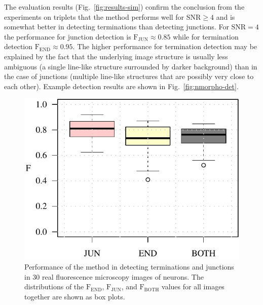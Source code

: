 The evaluation results (Fig.~\ref{fig:results-sim}) confirm the conclusion from the experiments on triplets that the method performs well for $\textrm{SNR} \geq 4$ and is somewhat better in detecting terminations than detecting junctions. For $\textrm{SNR} = 4$ the performance for junction detection is $\textrm{F}_{\textrm{JUN}} \approx 0.85$ while for termination detection $\textrm{F}_{\textrm{END}} \approx 0.95$. The higher performance for termination detection may be explained by the fact that the underlying image structure is usually less ambiguous (a single line-like structure surrounded by darker background) than in the case of junctions (multiple line-like structures that are possibly very close to each other). Example detection results are shown in Fig.~\ref{fig:nmorpho-det}.
\begin{figure}[!h]
	\centering
	\includegraphics[width=0.5\columnwidth]{overview_real}
	\caption{Performance of the method in detecting terminations and junctions in 30 real fluorescence microscopy images of neurons. The distributions of the $\textrm{F}_\textrm{END}$, $\textrm{F}_\textrm{JUN}$, and $\textrm{F}_\textrm{BOTH}$ values for all images together are shown as box plots.}
	\label{fig:results-real}
\end{figure}
